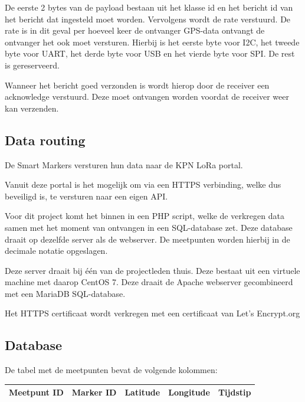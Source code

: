 De eerste 2 bytes van de payload bestaan uit het klasse id en het bericht id van
het bericht dat ingesteld moet worden. Vervolgens wordt de rate verstuurd. De
rate is in dit geval per hoeveel keer de ontvanger GPS-data ontvangt de
ontvanger het ook moet versturen.
Hierbij is het eerste byte voor I2C, het tweede byte voor UART, het derde byte
voor USB en het vierde byte voor SPI. De rest is gereserveerd.
\citep[p. 11]{UBlox8}

Wanneer het bericht goed verzonden is wordt hierop door de receiver een
acknowledge verstuurd. Deze moet ontvangen worden voordat de receiver weer
kan verzenden.

\subsection{Data routing}
De Smart Markers versturen hun data naar de KPN LoRa portal.

Vanuit deze portal is het mogelijk om via een HTTPS verbinding, welke dus beveiligd is,
te versturen naar een eigen API.

Voor dit project komt het binnen in een PHP script, welke de verkregen data samen met het
moment van ontvangen in een SQL-database zet. Deze database draait op dezelfde server als
de webserver. De meetpunten worden hierbij in de decimale notatie opgeslagen.

Deze server draait bij één van de projectleden thuis. Deze bestaat uit een virtuele
machine met daarop CentOS 7. Deze draait de Apache webserver gecombineerd met een
MariaDB SQL-database.

Het HTTPS certificaat wordt verkregen met een certificaat van Let's Encrypt.org

\subsection{Database}
\label{sec:database}
De tabel met de meetpunten bevat de volgende kolommen:\\
\begin{tabularx}{\textwidth}{| X | X | X | X | X |}
    \hline
    \textbf{Meetpunt ID} & \textbf{Marker ID} & \textbf{Latitude} & \textbf{Longitude} & \textbf{Tijdstip} \\ \hline
\end{tabularx}\\

